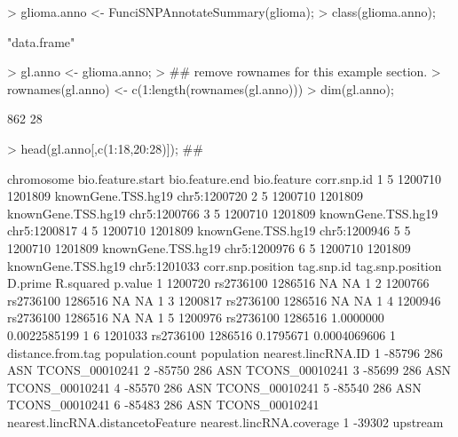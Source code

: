 \documentclass[12pt,fullpage]{article}
\begin{document}
\begin{Schunk}
\begin{Sinput}
> glioma.anno <- FunciSNPAnnotateSummary(glioma);
> class(glioma.anno);
\end{Sinput}
\begin{Soutput}
[1] "data.frame"
\end{Soutput}
\begin{Sinput}
> gl.anno <- glioma.anno;
> ## remove rownames for this example section.
> rownames(gl.anno) <- c(1:length(rownames(gl.anno)))
> dim(gl.anno);
\end{Sinput}
\begin{Soutput}
[1] 862  28
\end{Soutput}
\begin{Sinput}
> head(gl.anno[,c(1:18,20:28)]); ## 
\end{Sinput}
\begin{Soutput}
  chromosome bio.feature.start bio.feature.end        bio.feature  corr.snp.id
1          5           1200710         1201809 knownGene.TSS.hg19 chr5:1200720
2          5           1200710         1201809 knownGene.TSS.hg19 chr5:1200766
3          5           1200710         1201809 knownGene.TSS.hg19 chr5:1200817
4          5           1200710         1201809 knownGene.TSS.hg19 chr5:1200946
5          5           1200710         1201809 knownGene.TSS.hg19 chr5:1200976
6          5           1200710         1201809 knownGene.TSS.hg19 chr5:1201033
  corr.snp.position tag.snp.id tag.snp.position   D.prime    R.squared p.value
1           1200720  rs2736100          1286516        NA           NA       1
2           1200766  rs2736100          1286516        NA           NA       1
3           1200817  rs2736100          1286516        NA           NA       1
4           1200946  rs2736100          1286516        NA           NA       1
5           1200976  rs2736100          1286516 1.0000000 0.0022585199       1
6           1201033  rs2736100          1286516 0.1795671 0.0004069606       1
  distance.from.tag population.count population nearest.lincRNA.ID
1            -85796              286        ASN     TCONS_00010241
2            -85750              286        ASN     TCONS_00010241
3            -85699              286        ASN     TCONS_00010241
4            -85570              286        ASN     TCONS_00010241
5            -85540              286        ASN     TCONS_00010241
6            -85483              286        ASN     TCONS_00010241
  nearest.lincRNA.distancetoFeature nearest.lincRNA.coverage
1                            -39302                 upstream

\end{Soutput}
\end{Schunk}
\end{document}
